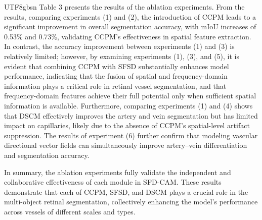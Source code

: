 \documentclass[times, review, 10pt]{elsarticle}
\begin{document}
\begin{CJK}{UTF8}{gbsn}
Table 3 presents the results of the ablation experiments. From the results, comparing experiments (1) and (2), the introduction of CCPM leads to a significant improvement in overall segmentation accuracy, with mIoU increases of 0.53\% and 0.73\%, validating CCPM’s effectiveness in spatial feature extraction. In contrast, the accuracy improvement between experiments (1) and (3) is relatively limited; however, by examining experiments (1), (3), and (5), it is evident that combining CCPM with SFSD substantially enhances model performance, indicating that the fusion of spatial and frequency-domain information plays a critical role in retinal vessel segmentation, and that frequency-domain features achieve their full potential only when sufficient spatial information is available. Furthermore, comparing experiments (1) and (4) shows that DSCM effectively improves the artery and vein segmentation but has limited impact on capillaries, likely due to the absence of CCPM’s spatial-level artifact suppression. The results of experiment (6) further confirm that modeling vascular directional vector fields can simultaneously improve artery–vein differentiation and segmentation accuracy.
\par
In summary, the ablation experiments fully validate the independent and collaborative effectiveness of each module in SFD-CAM. These results demonstrate that each of CCPM, SFSD, and DSCM plays a crucial role in the multi-object retinal segmentation, collectively enhancing the model’s performance across vessels of different scales and types.


\end{CJK}
\end{document}
